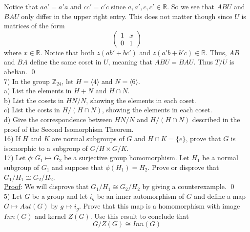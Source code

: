 \documentclass{article}
\begin{document}
Notice that $aa' = a'a$ and $cc' = c'c$ since $a, a', c, c' \in \mathbb{R}$. So we see that $ABU$ and $BAU$ only differ in the upper right entry. This does not matter though since $U$ is matrices of the form 
$$\begin{pmatrix}
1 & x \\
0 & 1
\end{pmatrix}$$ where $x \in \mathbb{R}$. Notice that both $z(ab' + bc')$ and $z(a'b + b'c) \in \mathbb{R}$. Thus, $AB$ and $BA$ define the same coset in $U$, meaning that $ABU = BAU$. Thus $T/U$ is abelian. \qed \\

7) In the group $\mathbb{Z}_{24}$, let $H = \langle 4 \rangle$ and $N = \langle 6 \rangle.$\\

a) List the elements in $H + N$ and $H \cap N$.\\

b) List the cosets in $HN/N$, showing the elements in each coset.\\

c) List the costs in $H/(H \cap N)$, showing the elements in each coset.\\

d) Give the correspondence between $HN/N$ and $H/(H \cap N)$ described in the proof of the Second Isomorphism Theorem. \\

16) If $H$ and $K$ are normal subgroups of $G$ and $H \cap K = \{ {e} \}$, prove that $G$ is isomorphic to a subgroup of $G/H \times G/K$. \\

17) Let $\phi : G_1 \mapsto G_2$ be a surjective group homomorphism. Let $H_1$ be a normal subgroup of $G_1$ and suppose that $\phi(H_1) = H_2$. Prove or disprove that $G_1/H_1 \cong G_2/H_2$. \\

\underline{Proof}: We will disprove that $G_1/H_1 \cong G_2/H_2$ by giving a counterexample.  \qed \\

5) Let $G$ be a group and let $i_g$ be an inner automorphism of $G$ and define a map $G \mapsto Aut(G)$ by $g \mapsto i_g$. Prove that this map is a homomorphism with image $Inn(G)$ and kernel $Z(G)$. Use this result to conclude that 
$$G/Z(G) \cong Inn(G)$$
\end{document}
